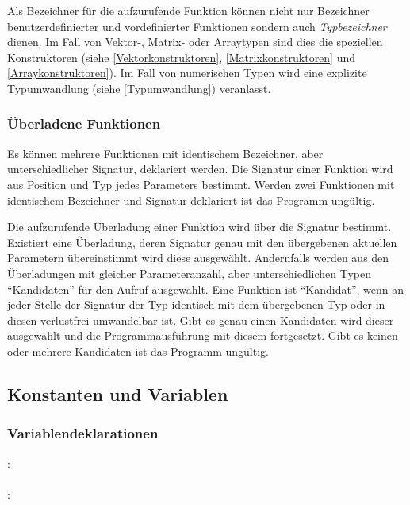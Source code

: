 Als Bezeichner für die aufzurufende Funktion können nicht nur Bezeichner benutzerdefinierter und
vordefinierter Funktionen sondern auch \emph{Typbezeichner} dienen.
Im Fall von Vektor-, Matrix- oder Arraytypen sind dies die speziellen Konstruktoren
(siehe \ref{Vektorkonstruktoren}, \ref{Matrixkonstruktoren} und \ref{Arraykonstruktoren}).
Im Fall von numerischen Typen wird eine explizite Typumwandlung (siehe
\ref{Typumwandlung}) veranlasst.


\subsubsection{Überladene Funktionen}\label{Ueberladene Funktionen}

Es können mehrere Funktionen mit identischem Bezeichner, aber unterschiedlicher Signatur,
deklariert werden. Die Signatur einer Funktion wird aus Position und Typ jedes Parameters
bestimmt. Werden zwei Funktionen mit identischem Bezeichner und Signatur deklariert ist
das Programm ungültig.

Die aufzurufende Überladung einer Funktion wird über die Signatur bestimmt. Existiert
eine Überladung, deren Signatur genau mit den übergebenen aktuellen Parametern
übereinstimmt wird diese ausgewählt. Andernfalls werden aus den Überladungen mit
gleicher Parameteranzahl, aber unterschiedlichen Typen "`Kandidaten"' für den
Aufruf ausgewählt. Eine Funktion ist "`Kandidat"', wenn an jeder Stelle der Signatur
der Typ identisch mit dem übergebenen Typ oder in diesen verlustfrei umwandelbar ist.
Gibt es genau einen Kandidaten wird dieser ausgewählt und die Programmausführung
mit diesem fortgesetzt. Gibt es keinen oder mehrere Kandidaten ist das Programm
ungültig.


\subsection{Konstanten und Variablen}\label{Konstanten und Variablen}
\subsubsection{Variablendeklarationen}\label{Variablendeklarationen}
:\label{dekl_var}\\
\hspace*{1cm} \Gspace{} \Gspace{}\\
:\label{dekl_var_bzch_init}\\
\hspace*{1cm}\Gspace{}\\

